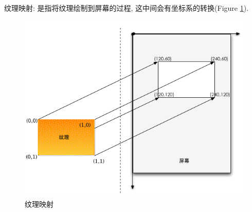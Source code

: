 {    {纹理映射: 是指将纹理绘制到屏幕的过程, 这中间会有坐标系的转换(Figure \ref{label_texture_mapping}). }
    \begin{figure}[htbp]
        \centering
        \caption{\label{label_texture_mapping} 纹理映射}
        \includegraphics[width=400pt, keepaspectratio]{texture_mapping.png}
    \end{figure}
    \par
}

